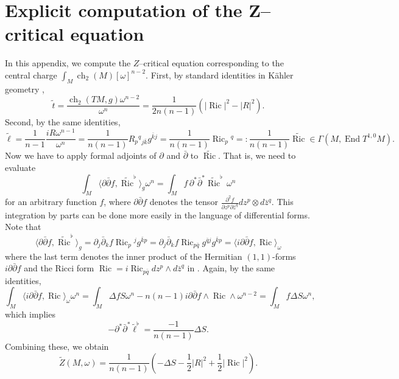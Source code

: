 \documentclass[12pt,reqno,a4paper]{amsart}
\numberwithin{equation}{section}
\DeclareMathOperator{\ch}{ch}
\DeclareMathOperator{\ric}{Ric}
\DeclareMathOperator{\End}{End}
\theoremstyle{definition}
\theoremstyle{remark}
\begin{document}
\appendix 
\section{Explicit computation of the Z--critical equation}\label{A}

In this appendix, we compute the $Z$--critical equation corresponding to the central charge $\int_M \ch_2(M) [\omega]^{n-2}$. 
First, by standard identities in K\"ahler geometry \cite[Lemma 4.7]{szekelyhidi2014introduction},
\begin{equation*}
\widetilde{t}=\frac{\ch_2(TM,g)\omega^{n-2}}{\omega^n}=\frac{1}{2n(n-1)}\left( |\ric|^2-|R|^2 \right).
\end{equation*}
Second, by the same identities,
\begin{equation*}
\widetilde{\ell}=\frac{1}{n-1}\frac{iR\omega^{n-1}}{\omega^n}=\frac{1}{n(n-1)}R_{p}{}^{q}{}_{j\bar{k}}g^{\bar{k}j}=\frac{1}{n(n-1)}{\ric}_{p}{}^{q}=:\frac{1}{n(n-1)}\widetilde{\ric}\in \Gamma(M,\End T^{1,0}M).
\end{equation*}
Now we have to apply formal adjoints of $\partial$ and $\bar{\partial}$ to $\widetilde{\ric}$. That is, we need to evaluate
\begin{equation*}
\int_M \langle \partial\bar{\partial}f, \widetilde{\ric}^\flat\rangle_g \omega^n=\int_M f \,\partial^* \bar{\partial}^* \widetilde{\ric}^\flat \,\omega^n
\end{equation*}
for an arbitrary function $f$, where $\partial\bar{\partial}f$ denotes the tensor $\frac{\partial^2 f }{\partial z^p\partial \bar{z}^q}dz^p\otimes d\bar{z}^q$. This integration by parts can be done more easily in the language of differential forms. Note that
\begin{equation*}
\langle \partial\bar{\partial}f, \widetilde{\ric}^\flat\rangle_g=\partial_j\bar{\partial}_kf {\ric}_{p}{}^{j}g^{\bar{k}p}=\partial_j\bar{\partial}_kf {\ric}_{p\bar{q}}g^{\bar{q}j}g^{\bar{k}p}=\langle i\partial\bar{\partial}f, \ric \rangle_\omega
\end{equation*}
where the last term denotes the inner product of the Hermitian $(1,1)$-forms $i\partial\bar{\partial}f$ and the Ricci form $\ric=i\ric_{p\bar{q}}dz^p \wedge d\bar{z}^q$
in \cite[Lemma 4.7]{szekelyhidi2014introduction}. Again, by the same identities,
\begin{equation*}
\int_M \langle i\partial\bar{\partial}f, \ric \rangle_\omega \omega^n=\int_M \Delta f S \omega^n -n(n-1)i\partial\bar{\partial}f\wedge\ric\wedge\omega^{n-2}=\int_M  f \Delta S \omega^n,
\end{equation*}
which implies
\begin{equation*}
-\partial^* \bar{\partial}^* \widetilde{\ell}^\flat=\frac{-1}{n(n-1)}\Delta S.
\end{equation*}
Combining these, we obtain 
\begin{equation*}
\widetilde{Z}(M,\omega)=\frac{1}{n(n-1)}(-\Delta S -\frac{1}{2}|R|^2+ \frac{1}{2}|\ric|^2).
\end{equation*}
\end{document}
